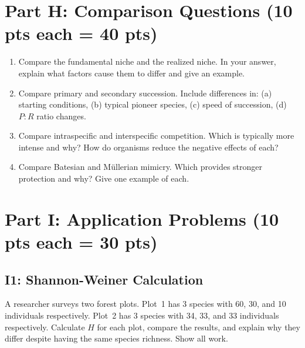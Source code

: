\documentclass[11pt]{article}
\begin{document}
\clearpage

\section*{Part H: Comparison Questions (10 pts each = 40 pts)}

\begin{enumerate}[label=\textbf{\arabic*.}]
  \item Compare the fundamental niche and the realized niche. In your answer, explain what factors cause them to differ and give an example.
  \vspace{3cm}

  \item Compare primary and secondary succession. Include differences in: (a) starting conditions, (b) typical pioneer species, (c) speed of succession, (d) $P\!:\!R$ ratio changes.
  \vspace{3cm}

  \item Compare intraspecific and interspecific competition. Which is typically more intense and why? How do organisms reduce the negative effects of each?
  \vspace{3cm}

  \item Compare Batesian and M\"{u}llerian mimicry. Which provides stronger protection and why? Give one example of each.
  \vspace{3cm}
\end{enumerate}

\clearpage

\section*{Part I: Application Problems (10 pts each = 30 pts)}

\subsection*{I1: Shannon-Weiner Calculation}
A researcher surveys two forest plots. Plot~1 has 3 species with 60, 30, and 10 individuals respectively. Plot~2 has 3 species with 34, 33, and 33 individuals respectively. Calculate $H$ for each plot, compare the results, and explain why they differ despite having the same species richness. Show all work.
\vspace{5cm}
\end{document}
